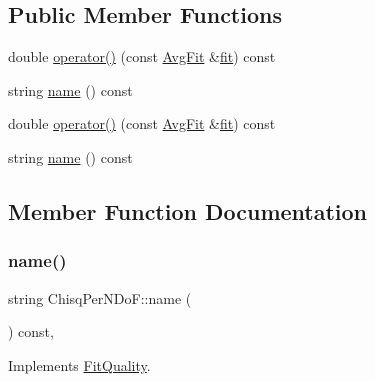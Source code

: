 \subsection*{Public Member Functions}
\begin{DoxyCompactItemize}
\item 
double \mbox{\hyperlink{classChisqPerNDoF_a4d45c53a895115c4fe318d22c44228e4}{operator()}} (const \mbox{\hyperlink{classAvgFit}{Avg\+Fit}} \&\mbox{\hyperlink{src_2lib_2three__point__timeslice__fitting_8h_aa079c61e69a3946e3351db64a3478612}{fit}}) const
\item 
string \mbox{\hyperlink{classChisqPerNDoF_a69870fb2d2f84fa15665bbc384cb1cf7}{name}} () const
\item 
double \mbox{\hyperlink{classChisqPerNDoF_a4d45c53a895115c4fe318d22c44228e4}{operator()}} (const \mbox{\hyperlink{classAvgFit}{Avg\+Fit}} \&\mbox{\hyperlink{src_2lib_2three__point__timeslice__fitting_8h_aa079c61e69a3946e3351db64a3478612}{fit}}) const
\item 
string \mbox{\hyperlink{classChisqPerNDoF_a69870fb2d2f84fa15665bbc384cb1cf7}{name}} () const
\end{DoxyCompactItemize}


\subsection{Member Function Documentation}
\mbox{\label{classChisqPerNDoF_a69870fb2d2f84fa15665bbc384cb1cf7}} 
\subsubsection{\texorpdfstring{name()}{name()}\hspace{0.1cm}{\footnotesize\ttfamily [1/2]}}
{\footnotesize\ttfamily string Chisq\+Per\+N\+Do\+F\+::name (\begin{DoxyParamCaption}{ }\end{DoxyParamCaption}) const\hspace{0.3cm}{\ttfamily [inline]}, {\ttfamily [virtual]}}



Implements \mbox{\hyperlink{classFitQuality_a3423e236f25d68cf822094b363a74780}{Fit\+Quality}}.

\mbox{\label{classChisqPerNDoF_a69870fb2d2f84fa15665bbc384cb1cf7}} 
